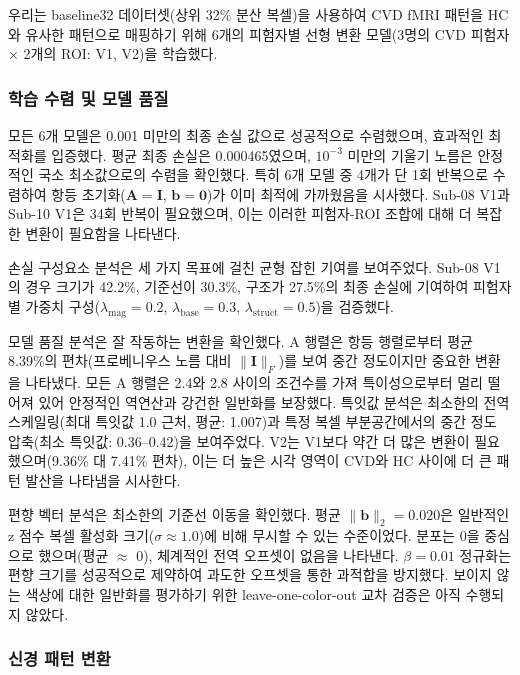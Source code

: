 \documentclass[12pt,a4paper]{article}
\begin{document}
우리는 baseline32 데이터셋(상위 32\% 분산 복셀)을 사용하여 CVD fMRI 패턴을 HC와 유사한 패턴으로 매핑하기 위해 6개의 피험자별 선형 변환 모델(3명의 CVD 피험자 × 2개의 ROI: V1, V2)을 학습했다.

\subsubsection{학습 수렴 및 모델 품질}

모든 6개 모델은 0.001 미만의 최종 손실 값으로 성공적으로 수렴했으며, 효과적인 최적화를 입증했다. 평균 최종 손실은 0.000465였으며, $10^{-3}$ 미만의 기울기 노름은 안정적인 국소 최소값으로의 수렴을 확인했다. 특히 6개 모델 중 4개가 단 1회 반복으로 수렴하여 항등 초기화($\mathbf{A} = \mathbf{I}$, $\mathbf{b} = \mathbf{0}$)가 이미 최적에 가까웠음을 시사했다. Sub-08 V1과 Sub-10 V1은 34회 반복이 필요했으며, 이는 이러한 피험자-ROI 조합에 대해 더 복잡한 변환이 필요함을 나타낸다.

손실 구성요소 분석은 세 가지 목표에 걸친 균형 잡힌 기여를 보여주었다. Sub-08 V1의 경우 크기가 42.2\%, 기준선이 30.3\%, 구조가 27.5\%의 최종 손실에 기여하여 피험자별 가중치 구성($\lambda_{\text{mag}}=0.2$, $\lambda_{\text{base}}=0.3$, $\lambda_{\text{struct}}=0.5$)을 검증했다.

모델 품질 분석은 잘 작동하는 변환을 확인했다. A 행렬은 항등 행렬로부터 평균 8.39\%의 편차(프로베니우스 노름 대비 $\|\mathbf{I}\|_F$)를 보여 중간 정도이지만 중요한 변환을 나타냈다. 모든 A 행렬은 2.4와 2.8 사이의 조건수를 가져 특이성으로부터 멀리 떨어져 있어 안정적인 역연산과 강건한 일반화를 보장했다. 특잇값 분석은 최소한의 전역 스케일링(최대 특잇값 1.0 근처, 평균: 1.007)과 특정 복셀 부분공간에서의 중간 정도 압축(최소 특잇값: 0.36--0.42)을 보여주었다. V2는 V1보다 약간 더 많은 변환이 필요했으며(9.36\% 대 7.41\% 편차), 이는 더 높은 시각 영역이 CVD와 HC 사이에 더 큰 패턴 발산을 나타냄을 시사한다.

편향 벡터 분석은 최소한의 기준선 이동을 확인했다. 평균 $\|\mathbf{b}\|_2 = 0.020$은 일반적인 z 점수 복셀 활성화 크기($\sigma \approx 1.0$)에 비해 무시할 수 있는 수준이었다. 분포는 0을 중심으로 했으며(평균 $\approx$ 0), 체계적인 전역 오프셋이 없음을 나타낸다. $\beta = 0.01$ 정규화는 편향 크기를 성공적으로 제약하여 과도한 오프셋을 통한 과적합을 방지했다. 보이지 않는 색상에 대한 일반화를 평가하기 위한 leave-one-color-out 교차 검증은 아직 수행되지 않았다.

\subsubsection{신경 패턴 변환}
\end{document}
